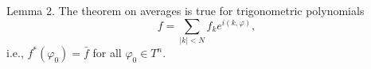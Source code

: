 Lemma 2. The theorem on averages is true for trigonometric polynomials
$$f = \sum_{|k| < N} f_k e^{i(k, \varphi)},$$
i.e., $f^*(\varphi_0) = \bar{f}$ for all $\varphi_0 \in T^n$.
